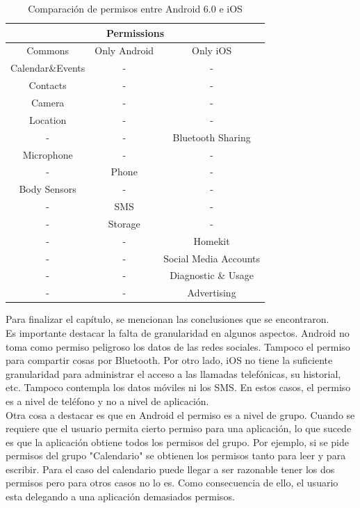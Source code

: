 \begin{table}[!ht]
	\center
	\begin{tabular}{|c|c|c|}
		\hline
		\multicolumn{3}{|c|}{Permissions} \\					\hline
		Commons 	& Only Android	& Only iOS \\				\hline
		Calendar\&Events	& -		& -	\\						\hline
		Contacts	& -				& - \\						\hline
		Camera		& -				& -	\\						\hline
		Location	& -				& -	\\						\hline
		-			& -				& Bluetooth Sharing \\		\hline
		Microphone  & -				& - \\						\hline
		-			& Phone			& -	\\						\hline
		Body Sensors	& -			& - \\						\hline
		-			& SMS			& - \\						\hline
		-			& Storage		& - \\						\hline
		-			& -				& Homekit \\				\hline
		-			& -				& Social Media Accounts \\	\hline
		-			& -				& Diagnostic \& Usage \\	\hline		
		-			& -				& Advertising \\			\hline
	\end{tabular}
	\caption{Comparación de permisos entre Android 6.0 e iOS}
	\label{tab:chapter03:compPerm}
\end{table}
Para finalizar el capítulo, se mencionan las conclusiones que se encontraron.\\
Es importante destacar la falta de granularidad en algunos aspectos. Android no toma como permiso peligroso los datos de las redes sociales. Tampoco el permiso para compartir cosas por Bluetooth. Por otro lado, iOS no tiene la suficiente granularidad para administrar el acceso a las llamadas telefónicas, su historial, etc. Tampoco contempla los datos móviles ni los SMS. En estos casos, el permiso es a nivel de teléfono y no a nivel de aplicación.\\

Otra cosa a destacar es que en Android el permiso es a nivel de grupo. Cuando se requiere que el usuario permita cierto permiso para una aplicación, lo que sucede es que la aplicación obtiene todos los permisos del grupo. Por ejemplo, si se pide permisos del grupo "Calendario" se obtienen los permisos tanto para leer y para escribir. Para el caso del calendario puede llegar a ser razonable tener los dos permisos pero para otros casos no lo es. Como consecuencia de ello, el usuario esta delegando a una aplicación demasiados permisos.
